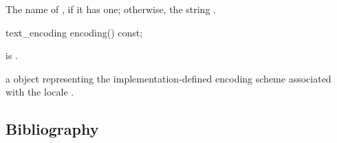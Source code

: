 \documentclass{wg21}
\begin{document}
\begin{itemdescr}
\pnum
\returns
The name of
,
if it has one; otherwise, the string .
\end{itemdescr}

\begin{addedblock}
\begin{itemdecl}
text_encoding encoding() const;
\end{itemdecl}

\begin{itemdescr}

\mandates {} is .

\returns a  object representing the implementation-defined encoding scheme associated with the locale .

\end{itemdescr}

%
%
%
%
\end{addedblock}

\subsection{Bibliography}
\end{document}
